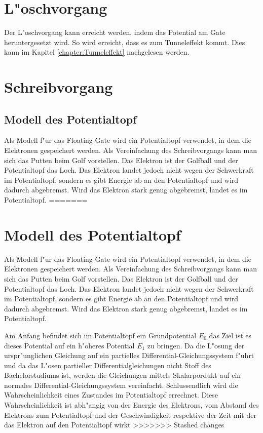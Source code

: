 \begin{refsection}
\section{L"oschvorgang}
Der L"oschvorgang kann erreicht werden, indem das Potential am Gate heruntergesetzt wird. So wird erreicht, dass es zum Tunneleffekt kommt. Dies kann im Kapitel \ref{chapter:Tunneleffekt} nachgelesen werden.


\section{Schreibvorgang}

\subsection{Modell des Potentialtopf}
Als Modell f"ur das Floating-Gate wird ein Potentialtopf verwendet, in dem die Elektronen gespeichert werden.
Als Vereinfachung des Schreibvorgangs kann man sich das Putten beim Golf vorstellen. Das Elektron ist der Golfball und der Potentialtopf das Loch. Das Elektron landet jedoch nicht wegen der Schwerkraft im Potentialtopf, sondern es gibt Energie ab an den Potentialtopf und wird dadurch abgebremst. Wird das Elektron stark genug abgebremst, landet es im Potentialtopf.
=======

\section{Modell des Potentialtopf}
Als Modell f"ur das Floating-Gate wird ein Potentialtopf verwendet, in dem die Elektronen gespeichert werden.
Als Vereinfachung des Schreibvorgangs kann man sich das Putten beim Golf vorstellen. Das Elektron ist der Golfball und der Potentialtopf das Loch. Das Elektron landet jedoch nicht wegen der Schwerkraft im Potentialtopf, sondern es gibt Energie ab an den Potentialtopf und wird dadurch abgebremst. Wird das Elektron stark genug abgebremst, landet es im Potentialtopf.

Am Anfang befindet sich im Potentialtopf ein Grundpotential $E_{0}$ das Ziel ist es dieses Potential auf ein h"oheres Potential $E_{1}$ zu bringen. Da die L"osung der urspr"unglichen Gleichung auf ein partielles Differential-Gleichungssystem f"uhrt und da das L"osen partieller Differentialgleichungen nicht Stoff des Bachelorstudiums ist, werden die Gleichungen mittels Skalarpordukt auf ein normales Differential-Gleichungssystem vereinfacht. Schlussendlich wird die Wahrscheinlichkeit eines Zustandes im Potentialtopf errechnet. Diese Wahrscheinlichkeit ist abh"angig von der Energie des Elektrons, vom Abstand des Elektrons zum Potentialtopf und der Geschwindigkeit respektive der Zeit mit der das Elektron auf den Potentialtopf wirkt 
>>>>>>> Stashed changes


\end{refsection}

